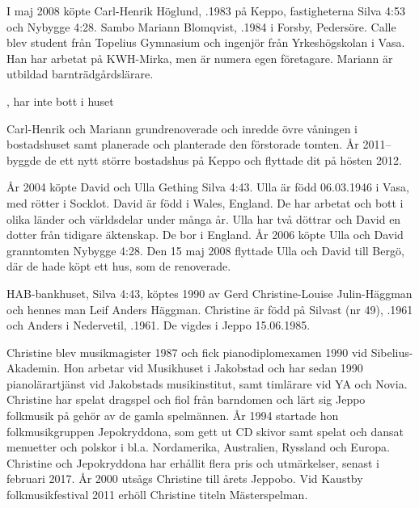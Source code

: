 %
I maj 2008 köpte Carl-Henrik Höglund, .1983 på Keppo, fastigheterna Silva 4:53 och Nybygge 4:28. Sambo Mariann Blomqvist, .1984 i Forsby, Pedersöre. Calle blev student från Topelius Gymnasium och ingenjör från Yrkeshögskolan i Vasa. Han har arbetat på KWH-Mirka, men är numera egen företagare. Mariann är utbildad barnträdgårdslärare.
\begin{jhchildren}
  \item {}
  \item {}
  \item {}, har inte bott i huset
\end{jhchildren}
Carl-Henrik och Mariann grundrenoverade och inredde övre våningen i bostadshuset samt planerade och planterade den förstorade tomten. År 2011-- byggde de ett nytt större bostadshus på Keppo och flyttade dit på hösten 2012.


%
År 2004 köpte David och Ulla Gething Silva 4:43. Ulla är född 06.03.1946 i Vasa, med rötter i Socklot. David är född i Wales, England. De har arbetat och bott i olika länder och världsdelar under många år. Ulla har två döttrar och David en dotter från tidigare äktenskap. De bor i England. År 2006 köpte Ulla och David granntomten Nybygge 4:28. Den 15 maj 2008 flyttade Ulla och David till Bergö, där de hade köpt ett hus, som de renoverade.


%
HAB-bankhuset, Silva 4:43, köptes 1990 av Gerd Christine-Louise Julin-Häggman och hennes man Leif Anders Häggman. Christine är född på Silvast (nr 49), .1961 och Anders i Nedervetil, .1961. De vigdes i Jeppo 15.06.1985.

Christine blev musikmagister 1987 och fick pianodiplomexamen 1990 vid Sibelius-Akademin. Hon arbetar vid Musikhuset i Jakobstad och har sedan 1990 pianolärartjänst vid Jakobstads musikinstitut, samt timlärare vid YA och Novia. Christine har spelat dragspel och fiol från barndomen och lärt sig Jeppo folkmusik på gehör av de gamla spelmännen. År 1994 startade hon folkmusikgruppen Jepokryddona, som gett ut CD skivor samt spelat och dansat menuetter och polskor i bl.a. Nordamerika, Australien, Ryssland och Europa. Christine och Jepokryddona har erhållit flera pris och utmärkelser, senast i februari 2017. År 2000 utsågs Christine till årets Jeppobo. Vid Kaustby folkmusikfestival 2011 erhöll Christine titeln Mästerspelman.

